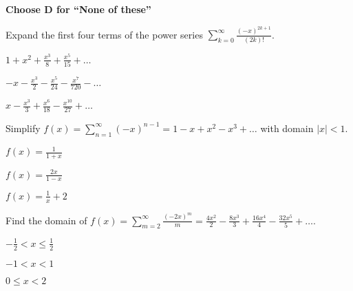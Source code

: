 \documentclass[12pt]{exam}
\newcommand{\<}{\langle}
\renewcommand{\>}{\rangle}
\begin{document}
\begin{center}
\end{center}
\vspace{0.1in}

\vspace{12pt}

\textbf{Choose D for ``None of these''}

\begin{questions}\setcounter{question}{41}

\question
Expand the first four terms of the power series
\(\sum_{k=0}^\infty \frac{(-x)^{2k+1}}{(2k)!}\).
\begin{choices}
\item \(1+x^2+\frac{x^3}{8}+\frac{x^5}{15}+\dots\)
\item \(-x-\frac{x^3}{2}-\frac{x^5}{24}-\frac{x^7}{720}-\dots\)
\item \(x-\frac{x^3}{3}+\frac{x^6}{18}-\frac{x^{10}}{27}+\dots\)
\end{choices}

\question
Simplify
\(f(x)=\sum_{n=1}^\infty (-x)^{n-1}=1-x+x^2-x^3+\dots\) with domain \(|x|<1\).
\begin{choices}
\item \(f(x)=\frac{1}{1+x}\)
\item \(f(x)=\frac{2x}{1-x}\)
\item \(f(x)=\frac{1}{x}+2\)
\end{choices}

\question
Find the domain of
\(f(x)=\sum_{m=2}^\infty\frac{(-2x)^m}{m}=
\frac{4x^2}{2}-\frac{8x^3}{3}+\frac{16x^4}{4}-\frac{32x^5}{5}+\dots\).
\begin{choices}
\item \(-\frac{1}{2}<x\leq\frac{1}{2}\)
\item \(-1<x<1\)
\item \(0\leq x<2\)
\end{choices}

\end{questions}
\end{document}
